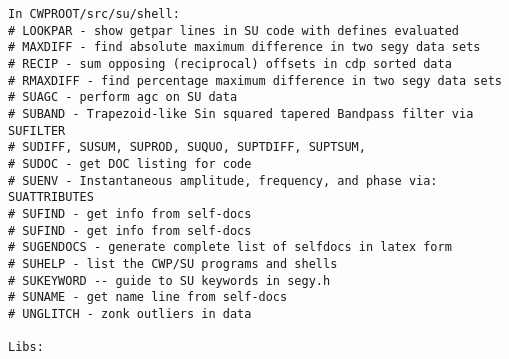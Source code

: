 {\begin{verbatim}
In CWPROOT/src/su/shell:
# LOOKPAR - show getpar lines in SU code with defines evaluated
# MAXDIFF - find absolute maximum difference in two segy data sets
# RECIP - sum opposing (reciprocal) offsets in cdp sorted data
# RMAXDIFF - find percentage maximum difference in two segy data sets
# SUAGC - perform agc on SU data 
# SUBAND - Trapezoid-like Sin squared tapered Bandpass filter via  SUFILTER
# SUDIFF, SUSUM, SUPROD, SUQUO, SUPTDIFF, SUPTSUM,
# SUDOC - get DOC listing for code
# SUENV - Instantaneous amplitude, frequency, and phase via: SUATTRIBUTES
# SUFIND - get info from self-docs
# SUFIND - get info from self-docs
# SUGENDOCS - generate complete list of selfdocs in latex form
# SUHELP - list the CWP/SU programs and shells
# SUKEYWORD -- guide to SU keywords in segy.h
# SUNAME - get name line from self-docs
# UNGLITCH - zonk outliers in data

Libs: 


\end{verbatim}}
